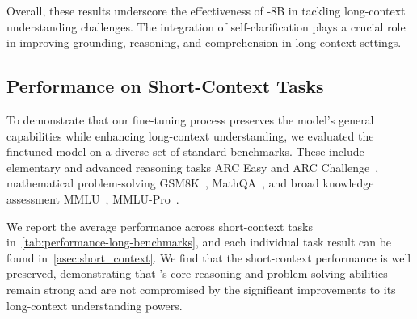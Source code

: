 Overall, these results underscore the effectiveness of \method-8B in tackling long-context understanding challenges. The integration of self-clarification plays a crucial role in improving grounding, reasoning, and comprehension in long-context settings.


\subsection{Performance on Short-Context Tasks}
To demonstrate that our fine-tuning process preserves the model's general capabilities while enhancing long-context understanding, we evaluated the finetuned model on a diverse set of standard benchmarks. These include elementary and advanced reasoning tasks ARC Easy and ARC Challenge~\cite{Clark2018ThinkYH}, mathematical problem-solving GSM8K~\cite{cobbe2021training}, MathQA~\cite{amini2019mathqa}, and broad knowledge assessment MMLU~\cite{hendryckstest2021, hendrycks2021ethics}, MMLU-Pro~\cite{wang2024mmlupro}.

We report the average performance across short-context tasks in~\cref{tab:performance-long-benchmarks}, and each individual task result can be found in~\cref{asec:short_context}. We find that the short-context performance is well preserved, demonstrating that \method's core reasoning and problem-solving abilities remain strong and are not compromised by the significant improvements to its long-context understanding powers.



